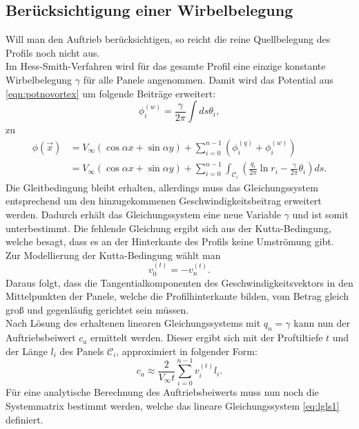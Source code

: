 \subsection{Berücksichtigung einer Wirbelbelegung}
Will man den Auftrieb berücksichtigen, so reicht die reine Quellbelegung des Profils noch nicht aus. \\
Im Hess-Smith-Verfahren wird für das gesamte Profil eine einzige konstante Wirbelbelegung $\gamma$ für alle Panele angenommen. Damit wird das Potential aus \eqref{eqn:potnovortex} um folgende Beiträge erweitert:
\begin{equation}
\phi_i^{(w)} =  \frac{\gamma}{2 \pi } \int ds \theta_i,
\end{equation}
zu
\begin{align}
\phi(\vec x) &=  V_{\infty} (\cos{\alpha} x + \sin{\alpha} y) + \sum_{i=0}^{n-1} \left( \phi_i^{(q)} + \phi_i^{(w)} \right) \nonumber \\
&= V_{\infty} (\cos{\alpha} x + \sin{\alpha} y) + \sum_{i=0}^{n-1} \int_{\mathcal{C}_i} \left( \frac{q_i}{2\pi } \ln r_i - \frac{\gamma}{2\pi } \theta_{i} \right) ds.
\end{align}
Die Gleitbedingung bleibt erhalten, allerdings muss das Gleichungssystem entsprechend um den hinzugekommenen Geschwindigkeitsbeitrag erweitert werden. Dadurch erhält das Gleichungssystem eine neue Variable $\gamma$ und ist somit unterbestimmt. Die fehlende Gleichung ergibt sich aus der Kutta-Bedingung, welche besagt, dass es an der Hinterkante des Profils keine Umströmung gibt.\\
Zur Modellierung der Kutta-Bedingung wählt man
\begin{equation}
v_0^{(t)} =  -v_n^{(t)}.
\end{equation} 
Daraus folgt, dass die Tangentialkomponenten des Geschwindigkeitsvektors in den Mittelpunkten der Panele, welche die Profilhinterkante bilden, vom Betrag gleich groß und gegenläufig gerichtet sein müssen. %
\\
Nach Lösung des erhaltenen linearen Gleichungssystems mit $q_n = \gamma$ kann nun der Auftriebsbeiwert $c_a$ ermittelt werden. Dieser ergibt sich mit der Proftiltiefe $t$ und der Länge $l_i$ des Panels $\mathcal{C}_i$, approximiert in folgender Form:
\begin{equation}
c_a \approx \frac{2}{V_{\infty}t}\sum_{i=0}^{n-1} v_i^{(t)} l_i.
\end{equation}
Für eine analytische Berechnung des Auftriebsbeiwerts muss nun noch die Systemmatrix bestimmt werden, welche das lineare Gleichungssystem \eqref{eq:lgls1} definiert. \cite{Hess:1966} \cite{Cebeci:1999} \cite{Alonso:2005}

